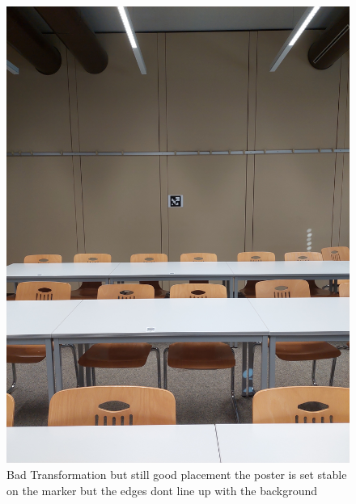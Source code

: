\documentclass[a4paper,twocolumn]{article}
\begin{document}
\begin{figure}[h!]
    \centering
    \includegraphics[width=0.9\columnwidth]{img/20221115_113319.jpg} %
    \caption{Bad Transformation but still good placement the poster is set stable on the marker but the edges dont line up with the background }
    \label{fig:20221115_113319.jpg}
    \end{figure}
    
\end{document}
